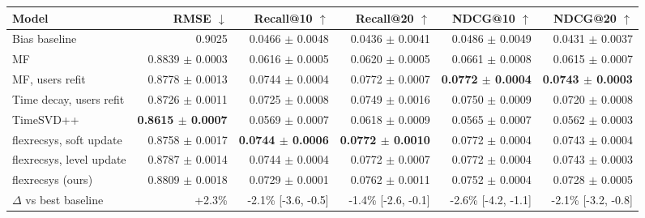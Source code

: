 \begin{tabular}{lrrrrr}
\toprule
Model & RMSE $\downarrow$ & Recall@10 $\uparrow$ & Recall@20 $\uparrow$ & NDCG@10 $\uparrow$ & NDCG@20 $\uparrow$ \\
\midrule
Bias baseline & 0.9025 & 0.0466 $\pm$ 0.0048 & 0.0436 $\pm$ 0.0041 & 0.0486 $\pm$ 0.0049 & 0.0431 $\pm$ 0.0037 \\
MF & 0.8839 $\pm$ 0.0003 & 0.0616 $\pm$ 0.0005 & 0.0620 $\pm$ 0.0005 & 0.0661 $\pm$ 0.0008 & 0.0615 $\pm$ 0.0007 \\
MF, users refit & 0.8778 $\pm$ 0.0013 & 0.0744 $\pm$ 0.0004 & 0.0772 $\pm$ 0.0007 & \textbf{0.0772 $\pm$ 0.0004} & \textbf{0.0743 $\pm$ 0.0003} \\
Time decay, users refit & 0.8726 $\pm$ 0.0011 & 0.0725 $\pm$ 0.0008 & 0.0749 $\pm$ 0.0016 & 0.0750 $\pm$ 0.0009 & 0.0720 $\pm$ 0.0008 \\
TimeSVD++ & \textbf{0.8615 $\pm$ 0.0007} & 0.0569 $\pm$ 0.0007 & 0.0618 $\pm$ 0.0009 & 0.0565 $\pm$ 0.0007 & 0.0562 $\pm$ 0.0003 \\
flexrecsys, soft update & 0.8758 $\pm$ 0.0017 & \textbf{0.0744 $\pm$ 0.0006} & \textbf{0.0772 $\pm$ 0.0010} & 0.0772 $\pm$ 0.0004 & 0.0743 $\pm$ 0.0004 \\
flexrecsys, level update & 0.8787 $\pm$ 0.0014 & 0.0744 $\pm$ 0.0004 & 0.0772 $\pm$ 0.0007 & 0.0772 $\pm$ 0.0004 & 0.0743 $\pm$ 0.0003 \\
flexrecsys (ours) & 0.8809 $\pm$ 0.0018 & 0.0729 $\pm$ 0.0001 & 0.0762 $\pm$ 0.0011 & 0.0752 $\pm$ 0.0004 & 0.0728 $\pm$ 0.0005 \\
\midrule
$\Delta$ vs best baseline & +2.3\% & -2.1\% [-3.6, -0.5] & -1.4\% [-2.6, -0.1] & -2.6\% [-4.2, -1.1] & -2.1\% [-3.2, -0.8] \\
\bottomrule
\end{tabular}
